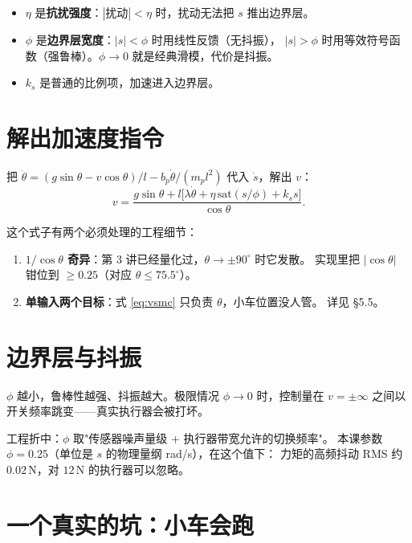 \begin{itemize}[leftmargin=2em,itemsep=2pt]
  \item $\eta$ 是\textbf{抗扰强度}：$|扰动|<\eta$ 时，扰动无法把 $s$ 推出边界层。
  \item $\phi$ 是\textbf{边界层宽度}：$|s|<\phi$ 时用线性反馈（无抖振），
        $|s|>\phi$ 时用等效符号函数（强鲁棒）。$\phi\to0$ 就是经典滑模，代价是抖振。
  \item $k_s$ 是普通的比例项，加速进入边界层。
\end{itemize}

\section{解出加速度指令}

把 $\ddot\theta=(g\sin\theta-v\cos\theta)/l-b_p\dot\theta/(m_pl^2)$ 代入 $\dot s$，解出 $v$：
\begin{equation}
  v=\frac{g\sin\theta+l\big[\lambda\dot\theta+\eta\,\mathrm{sat}(s/\phi)+k_s s\big]}{\cos\theta}.
  \label{eq:vsmc}
\end{equation}

这个式子有两个必须处理的工程细节：

\begin{enumerate}[leftmargin=2em,itemsep=2pt]
  \item \textbf{$1/\cos\theta$ 奇异}：第 3 讲已经量化过，$\theta\to\pm90^\circ$ 时它发散。
        实现里把 $|\cos\theta|$ 钳位到 $\ge0.25$（对应 $\theta\le75.5^\circ$）。
  \item \textbf{单输入两个目标}：式 \eqref{eq:vsmc} 只负责 $\theta$，小车位置没人管。
        详见 \S5.5。
\end{enumerate}

\section{边界层与抖振}

$\phi$ 越小，鲁棒性越强、抖振越大。极限情况 $\phi\to0$ 时，控制量在
$v=\pm\infty$ 之间以开关频率跳变——真实执行器会被打坏。

工程折中：$\phi$ 取"传感器噪声量级 + 执行器带宽允许的切换频率"。
本课参数 $\phi=0.25$（单位是 $s$ 的物理量纲 rad/s），在这个值下：
力矩的高频抖动 RMS 约 $0.02$\,N，对 $12$\,N 的执行器可以忽略。

\section{一个真实的坑：小车会跑}

